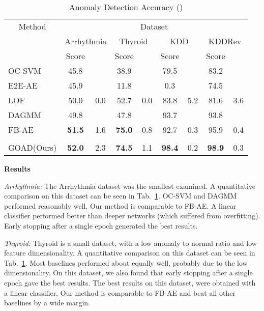 \documentclass{article} \usepackage{iclr2020_conference,times}
\begin{document}
\begin{table}[t]
  \centering
      
  \caption{Anomaly Detection Accuracy ()}
  \label{tab:exp_small}

    \begin{tabular}{lcccccccc}
    \toprule              
    \multicolumn{1}{c}{Method} & \multicolumn{8}{c}{Dataset} \\
    \cmidrule(l){1-1} \cmidrule(l){2-9}
     & \multicolumn{2}{c}{Arrhythmia} & \multicolumn{2}{c}{Thyroid} & \multicolumn{2}{c}{KDD} & \multicolumn{2}{c}{KDDRev}\\
	 \cmidrule(l){2-5} \cmidrule(l){6-9}
	&  Score &  &  Score &  &  Score &  &  Score &  \\
    \cmidrule(l){1-1} \cmidrule(l){2-5} \cmidrule(l){6-9}
    OC-SVM & 45.8 & & 38.9 & & 79.5  & & 83.2 &  \\
E2E-AE & 45.9 &  & 11.8 & & 0.3 & & 74.5 & \\
    LOF & 50.0 & 0.0 & 52.7 & 0.0  & 83.8 & 5.2 & 81.6 & 3.6 \\
DAGMM & 49.8 &  & 47.8 & & 93.7 & & 93.8 & \\
     FB-AE& \textbf{51.5} & 1.6 & \textbf{75.0} & 0.8&92.7&0.3& 95.9 & 0.4\\
    \midrule \vspace{-1em}\\
     GOAD(Ours) & \textbf{52.0} & 2.3  & \textbf{74.5} & 1.1 & \textbf{98.4} & 0.2 & \textbf{98.9} & 0.3 \\
	 \bottomrule
    \end{tabular}

\end{table}

\textbf{Results}

\textit{Arrhythmia:} The Arrhythmia dataset was the smallest examined. A quantitative comparison on this dataset can be seen in Tab.~\ref{tab:exp_small}.  OC-SVM and DAGMM performed reasonably well. Our method is comparable to FB-AE. A linear classifier  performed better than deeper networks (which suffered from overfitting). Early stopping after a single epoch generated the best results. 

\textit{Thyroid:} Thyroid is a small dataset, with a low anomaly to normal ratio and low feature dimensionality. A quantitative comparison on this dataset can be seen in Tab.~\ref{tab:exp_small}. Most baselines performed about equally well, probably due to the low dimensionality. On this dataset, we also found that early stopping after a single epoch gave the best results. The best results on this dataset, were obtained with a linear classifier. Our method is comparable to FB-AE and beat all other baselines by a wide margin.
\end{document}
